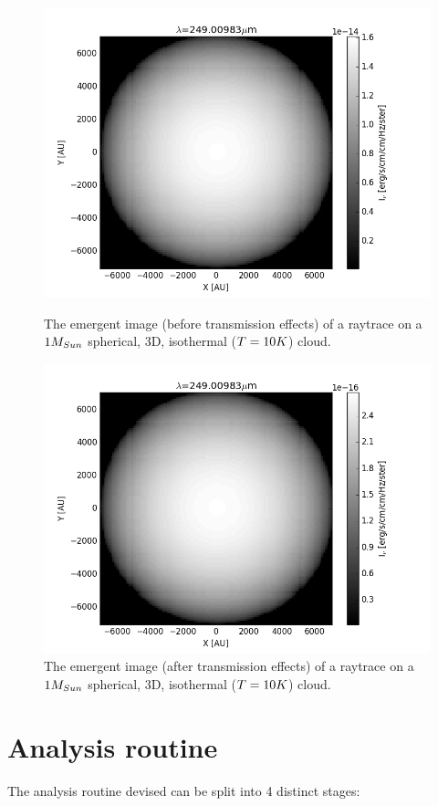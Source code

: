 \documentclass{report}
\begin{document}
\begin{figure}[!htb]
  \includegraphics[width=\linewidth]{../img/figure_1_no_trans.png}
  \caption{The emergent image (before transmission effects) of a raytrace on a $1\/M_{Sun}$ spherical, 3D, isothermal ($T=10\/K$) cloud.}\label{fig:np-trans}
\endminipage\hfill
{}
  \includegraphics[width=\linewidth]{../img/figure_1.png}
  \caption{The emergent image (after transmission effects) of a raytrace on a $1\/M_{Sun}$ spherical, 3D, isothermal ($T=10\/K$) cloud.}\label{fig:trans}
\endminipage
\end{figure}

\section{Analysis routine}
The analysis routine devised can be split into 4 distinct stages:
\end{document}
